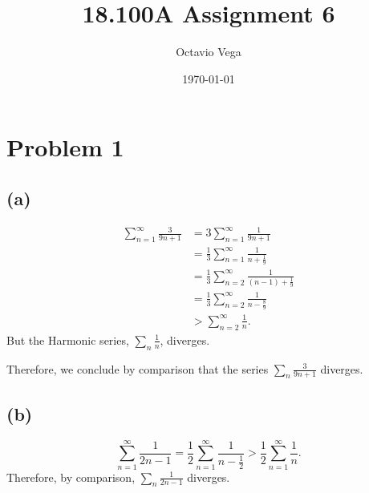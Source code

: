 \documentclass{article}
\title{18.100A Assignment 6}
\author{Octavio Vega}
\date\today
\begin{document}
\maketitle
	
\section*{Problem 1}
\subsection*{(a)}
\begin{align}
	\sum_{n=1}^{\infty} \frac{3}{9n+1} &= 3\sum_{n=1}^{\infty} \frac{1}{9n+1} \\
	&= \frac{1}{3}\sum_{n=1}^{\infty}\frac{1}{n+\frac{1}{9}} \\
	&= \frac{1}{3}\sum_{n=2}^{\infty}\frac{1}{(n-1)+\frac{1}{9}} \\
	&= \frac{1}{3}\sum_{n=2}^{\infty} \frac{1}{n-\frac{8}{9}} \\
	&> \sum_{n=2}^{\infty} \frac{1}{n}.
\end{align}
But the Harmonic series, $\sum_n \frac{1}{n}$, diverges.

Therefore, we conclude by comparison that the series $\sum_n \frac{3}{9n+1}$ diverges.

\subsection*{(b)}
\begin{equation}
	\sum_{n=1}^{\infty}\frac{1}{2n-1} = \frac{1}{2}\sum_{n=1}^{\infty}\frac{1}{n-\frac{1}{2}} > \frac{1}{2}\sum_{n=1}^{\infty}\frac{1}{n}.
\end{equation}
Therefore, by comparison, $\sum_n \frac{1}{2n-1}$ diverges.
\end{document}
